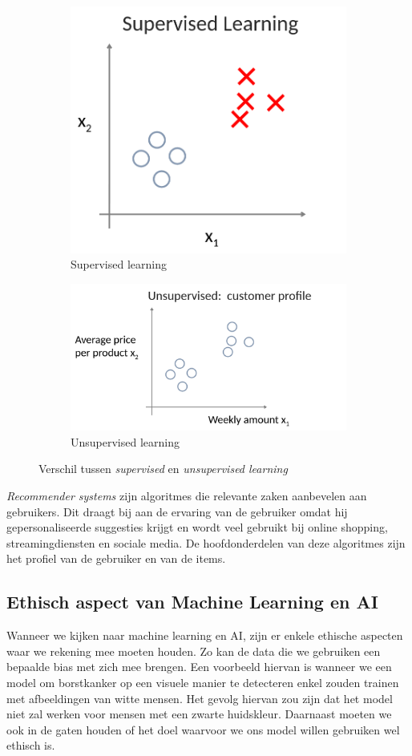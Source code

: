 \begin{figure}[h]
	\centering
	\begin{subfigure}{.5\textwidth}
		\centering
		\includegraphics[height=0.45\textwidth]{images/1-supervised-learning.png}
		\caption{Supervised learning}
		\label{fig:supervised-learning}
	\end{subfigure}%
	\begin{subfigure}{.5\textwidth}
		\centering
		\includegraphics[height=0.45\textwidth]{images/2-unsupervised-learning.png}
		\caption{Unsupervised learning}
		\label{fig:unsupervised-learning}
	\end{subfigure}
	\caption{Verschil tussen \textit{supervised} en \textit{unsupervised learning}}
	\label{fig:supervised-vs-unsupervised-learning}
\end{figure}

\noindent
\textit{Recommender systems} zijn algoritmes die relevante zaken aanbevelen aan gebruikers. Dit draagt bij aan de ervaring van de gebruiker omdat hij gepersonaliseerde suggesties krijgt en wordt veel gebruikt bij online shopping, streamingdiensten en sociale media. De hoofdonderdelen van deze algoritmes zijn het profiel van de gebruiker en van de items.

\subsection{Ethisch aspect van Machine Learning en AI}

Wanneer we kijken naar machine learning en AI, zijn er enkele ethische aspecten waar we rekening mee moeten houden. Zo kan de data die we gebruiken een bepaalde bias met zich mee brengen. Een voorbeeld hiervan is wanneer we een model om borstkanker op een visuele manier te detecteren enkel zouden trainen met afbeeldingen van witte mensen. Het gevolg hiervan zou zijn dat het model niet zal werken voor mensen met een zwarte huidskleur. Daarnaast moeten we ook in de gaten houden of het doel waarvoor we ons model willen gebruiken wel ethisch is. 
\newpage
